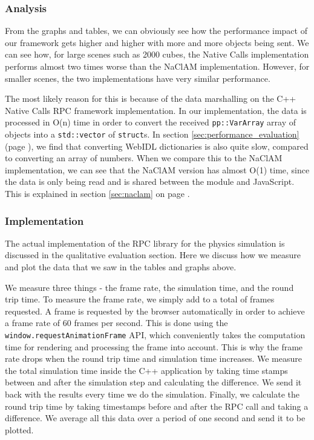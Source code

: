 
\subsubsection{Analysis} %
\label{ssub:bullet_physics_performanceanalysis}
From the graphs and tables, we can obviously see how the performance impact of our framework gets higher and higher with more and more objects being sent. We can see how, for large scenes such as 2000 cubes, the Native Calls implementation performs almost two times worse than the NaClAM implementation. However, for smaller scenes, the two implementations have very similar performance.

The most likely reason for this is because of the data marshalling on the C++ Native Calls RPC framework implementation. In our implementation, the data is processed in O(n) time in order to convert the received \lstinline{pp::VarArray} array of objects into a \lstinline{std::vector} of \lstinline{struct}s. In section \ref{sec:performance_evaluation} (page \pageref{sec:performance_evaluation}), we find that converting WebIDL dictionaries is also quite slow, compared to converting an array of numbers. When we compare this to the NaClAM implementation, we can see that the NaClAM version has almost O(1) time, since the data is only being read and is shared between the module and JavaScript. This is explained in section \ref{sec:naclam} on page \pageref{sec:naclam}.


\subsubsection{Implementation} %
\label{ssub:implementation_bullet_physics_performance}
The actual implementation of the RPC library for the physics simulation is discussed in the qualitative evaluation section. Here we discuss how we measure and plot the data that we saw in the tables and graphs above.

We measure three things - the frame rate, the simulation time, and the round trip time. To measure the frame rate, we simply add to a total of frames requested. A frame is requested by the browser automatically in order to achieve a frame rate of 60 frames per second. This is done using the \lstinline{window.requestAnimationFrame} API, which conveniently takes the computation time for rendering and processing the frame into account. This is why the frame rate drops when the round trip time and simulation time increases. We measure the total simulation time inside the C++ application by taking time stamps between and after the simulation step and calculating the difference. We send it back with the results every time we do the simulation. Finally, we calculate the round trip time by taking timestamps before and after the RPC call and taking a difference. We average all this data over a period of one second and send it to be plotted.

